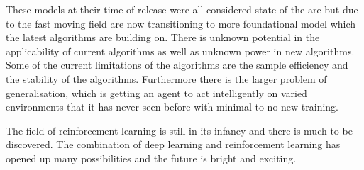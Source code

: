 These models at their time of release were all considered state of the are but due to the fast moving field are now transitioning to more foundational model which the latest algorithms are building on. There is unknown potential in the applicability of current algorithms as well as unknown power in new algorithms. Some of the current limitations of the algorithms are the sample efficiency and the stability of the algorithms. Furthermore there is the larger problem of generalisation, which is getting an agent to act intelligently on varied environments that it has never seen before with minimal to no new training.

The field of reinforcement learning is still in its infancy and there is much to be discovered. The combination of deep learning and reinforcement learning has opened up many possibilities and the future is bright and exciting.